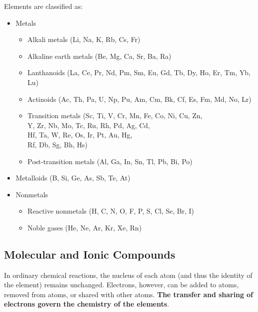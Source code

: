\documentclass{article}
\begin{document}
Elements are classified as:
\begin{itemize}
    \item Metals
        \begin{itemize}
            \item Alkali metals (Li, Na, K, Rb, Cs, Fr)
            \item Alkaline earth metals (Be, Mg, Ca, Sr, Ba, Ra)
            \item Lanthanoids (La, Ce, Pr, Nd, Pm, Sm, Eu, Gd, Tb, Dy, Ho, Er, Tm, Yb, Lu)
            \item Actinoids (Ac, Th, Pa, U, Np, Pu, Am, Cm, Bk, Cf, Es, Fm, Md, No, Lr)
            \item Transition metals (Sc, Ti, V, Cr, Mn, Fe, Co, Ni, Cu, Zn,\\
                Y, Zr, Nb, Mo, Tc, Ru, Rh, Pd, Ag, Cd,\\
                Hf, Ta, W, Re, Os, Ir, Pt, Au, Hg,\\
                Rf, Db, Sg, Bh, Hs)
            \item Post-transition metals (Al, Ga, In, Sn, Tl, Pb, Bi, Po) 
        \end{itemize}
    \item Metalloids (B, Si, Ge, As, Sb, Te, At)
    \item Nonmetals
        \begin{itemize}
            \item Reactive nonmetals (H, C, N, O, F, P, S, Cl, Se, Br, I) 
            \item Noble gases (He, Ne, Ar, Kr, Xe, Rn)
        \end{itemize}
\end{itemize}
\subsection{Molecular and Ionic Compounds}
\label{sec: molecular-ionic}

In ordinary chemical reactions, the nucleus of each atom (and thus the identity of the element) remains unchanged. Electrons, however, can be added to atoms, removed from atoms, or shared with other atoms. \textbf{The transfer and sharing of electrons govern the chemistry of the elements}.
\end{document}
